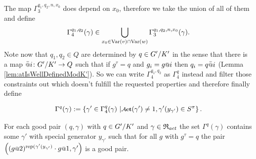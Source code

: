 \documentclass[a4paper,11pt]{amsart}
\begin{document}
 The map $\Gamma_3^{q_1,q_2,n,x_0}$ does depend on $x_0$, therefore we take the union of all of them and define
  \[\Gamma_4^{q_1,q_2}(\gamma)\in \bigcup_{x_0\in \textup{Var}(v)\cap\textup{Var}(w)}\Gamma_3^{q_1,q_2,n,x_0}(\gamma).\]
 Note now that $q_{1},q_2\in Q$ are determined by $q\in{G'/K'}$ in the sense that there is a map $\att{i}\colon \RNK{G'}{K'}\to Q$ such that if $g^\tau = q$ and $g_i=g\at{i}$ 
 then $q_i = q\att{i}$ (Lemma \ref{lem:atIsWellDefinedModK'}). So we can write $\Gamma_4^{q_1,q_2}$ as $\Gamma_4^q$ instead and filter those 
 constraints out which doesn't fulfill the requested properties and therefore finally define
 \begin{defi}\label{def:Gammaq}
 \[\Gamma^q(\gamma) := \left\{\gamma' \in \Gamma_4^q(\gamma) \bigmid 
  \act(\gamma')\neq 1, \gamma'({y_{\gamma'}}) \in S^\pi \right\}.\]
 \end{defi}
 \begin{pro}\label{pro:existsNextPair}
 For each good pair $(q,\gamma)$ with $q\in{G'/K'}$ and $\gamma\in\mathfrak{R}_{act}$ the set $\Gamma^q(\gamma)$ 
 contains some $\gamma'$ with special generator $y_{\gamma'}$ such that for all $g$ with $g^\tau=q$ the
 pair $\left((g\at{2})^{\textup{rep}(\gamma'(y_{\gamma'})}\cdot g\at{1},\gamma'\right)$ is a good pair.
\end{pro}
\end{document}
